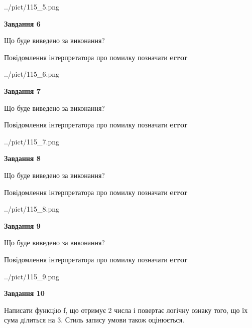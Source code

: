 \documentclass[12pt, ukrainian]{article}
\begin{document}
{\begin {large}
\begin{center}
	{../pict/115_5.png}
\end{center}
\newpage

{\begin {center}\textbf{Завдання 6}\end {center}}\par
Що буде виведено за виконання? \par
Повідомлення інтерпретатора про помилку позначати \textbf{error}

\begin{center}
	{../pict/115_6.png}
\end{center}
\newpage

{\begin {center}\textbf{Завдання 7}\end {center}}\par
Що буде виведено за виконання? \par
Повідомлення інтерпретатора про помилку позначати \textbf{error}

\begin{center}
	{../pict/115_7.png}
\end{center}
\newpage

{\begin {center}\textbf{Завдання 8}\end {center}}\par
Що буде виведено за виконання? \par
Повідомлення інтерпретатора про помилку позначати \textbf{error}

\begin{center}
	{../pict/115_8.png}
\end{center}
\newpage

{\begin {center}\textbf{Завдання 9}\end {center}}\par
Що буде виведено за виконання? \par
Повідомлення інтерпретатора про помилку позначати \textbf{error}

\begin{center}
	{../pict/115_9.png}
\end{center}
\newpage

{\begin {center}\textbf{Завдання 10}\end {center}}\par

Написати функцiю f, що отримує 2 числа і повертає логічну ознаку того, що їх сума дiлиться на 3. Стиль запису умови також оцінюється.\par
\newpage

\end {large}}
\end{document}
